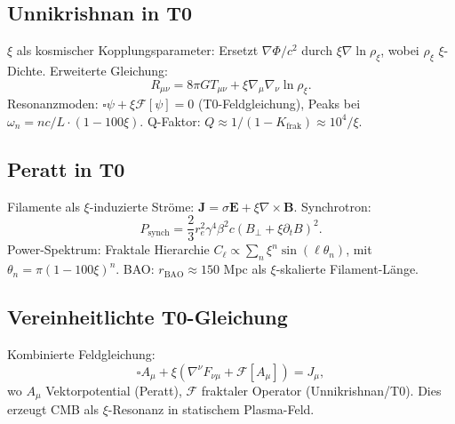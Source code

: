	\subsection{Unnikrishnan in T0}
	$\xi$ als kosmischer Kopplungsparameter: Ersetzt $\nabla \Phi / c^2$ durch $\xi \nabla \ln \rho_\xi$, wobei $\rho_\xi$ $\xi$-Dichte. Erweiterte Gleichung:
	\begin{equation}
		R_{\mu\nu} = 8\pi G T_{\mu\nu} + \xi \nabla_\mu \nabla_\nu \ln \rho_\xi.
	\end{equation}
	Resonanzmoden: $\square \psi + \xi \mathcal{F}[\psi] = 0$ (T0-Feldgleichung), Peaks bei $\omega_n = n c / L \cdot (1 - 100 \xi)$. Q-Faktor: $Q \approx 1 / (1 - K_{\text{frak}}) \approx 10^4 / \xi$.
	\subsection{Peratt in T0}
	Filamente als $\xi$-induzierte Ströme: $\mathbf{J} = \sigma \mathbf{E} + \xi \nabla \times \mathbf{B}$. Synchrotron:
	\begin{equation}
		P_{\text{synch}} = \frac{2}{3} r_e^2 \gamma^4 \beta^2 c (B_\perp + \xi \partial_t B)^2.
	\end{equation}
	Power-Spektrum: Fraktale Hierarchie $C_\ell \propto \sum_n \xi^n \sin(\ell \theta_n)$, mit $\theta_n = \pi (1 - 100 \xi)^n$. BAO: $r_{\text{BAO}} \approx 150$ Mpc als $\xi$-skalierte Filament-Länge.
	\subsection{Vereinheitlichte T0-Gleichung}
	Kombinierte Feldgleichung:
	\begin{equation}
		\square A_\mu + \xi \left( \nabla^\nu F_{\nu\mu} + \mathcal{F}[A_\mu] \right) = J_\mu,
	\end{equation}
	wo $A_\mu$ Vektorpotential (Peratt), $\mathcal{F}$ fraktaler Operator (Unnikrishnan/T0). Dies erzeugt CMB als $\xi$-Resonanz in statischem Plasma-Feld.
